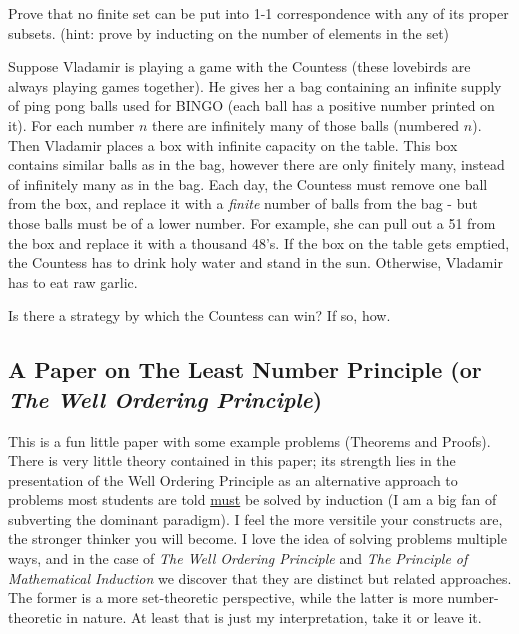 \begin{problem}
Prove that no finite set can be put into 1-1 correspondence with any of its proper subsets. (hint: prove by inducting on the number of elements in the set)
\end{problem}


\begin{problem}
Suppose Vladamir is playing a game with the Countess (these lovebirds are always playing games together).  He gives her a bag containing an infinite supply of ping pong balls used for BINGO (each ball has a positive number printed on it).  For each number $n$ there are infinitely many of those balls (numbered $n$).  Then Vladamir places a box with infinite capacity on the table.  This box contains similar balls as in the bag, however there are only finitely many, instead of infinitely many as in the bag.  
Each day, the Countess must remove one ball from the box, and replace it with a \emph{finite} number of balls from the bag - but those balls must be of a lower number.  For example, she can pull out a 51 from the box and replace it with a thousand 48's.  If the box on the table gets emptied, the Countess has to drink holy water and stand in the sun.  Otherwise, Vladamir has to eat raw garlic.  

Is there a strategy by which the Countess can win?  If so, how.

\end{problem}\label{ballsGame}

\newpage
\subsection{A Paper on The Least Number Principle (or \emph{The Well Ordering Principle})}
This is a fun little paper with some example problems (Theorems and Proofs).  There is very little theory contained in this paper; its strength lies in the presentation of the Well Ordering Principle as an alternative approach to problems most students are told \underline{must} be solved by induction (I am a big fan of subverting the dominant paradigm).  I feel the more versitile your constructs are, the stronger thinker you will become.  I love the idea of solving problems multiple ways, and in the case of \emph{The Well Ordering Principle} and \emph{The Principle of Mathematical Induction} we discover that they are distinct but related approaches.  The former is a more set-theoretic perspective, while the latter is more number-theoretic in nature.  At least that is just my interpretation, take it or leave it.\cite{machale2008}
\fancyfoot[CE CO]{}
\fancyfoot[RE,RO]{}
\fancyfoot[LE,LO]{}

